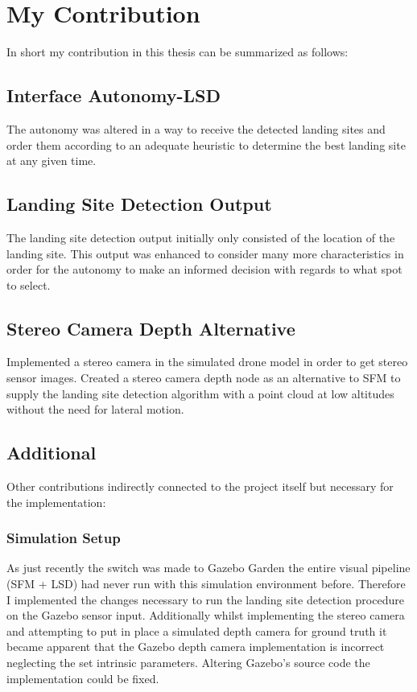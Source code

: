 \chapter{My Contribution}

In short my contribution in this thesis can be summarized as follows:

\section{Interface Autonomy-LSD}
The autonomy was altered in a way to receive the detected landing sites and order them according to an adequate heuristic to determine the best landing site at any given time.
\section{Landing Site Detection Output}
The landing site detection output initially only consisted of the location of the landing site. This output was enhanced to consider many more characteristics in order for the autonomy to make an informed decision with regards to what spot to select.
\section{Stereo Camera Depth Alternative}
Implemented a stereo camera in the simulated drone model in order to get stereo sensor images. Created a stereo camera depth node as an alternative to SFM to supply the landing site detection algorithm with a point cloud at low altitudes without the need for lateral motion. 
\section{Additional}
Other contributions indirectly connected to the project itself but necessary for the implementation:
\subsection{Simulation Setup}
As just recently the switch was made to Gazebo Garden the entire visual pipeline (SFM + LSD) had never run with this simulation environment before. Therefore I implemented the changes necessary to run the landing site detection procedure on the Gazebo sensor input. Additionally whilst implementing the stereo camera and attempting to put in place a simulated depth camera for ground truth it became apparent that the Gazebo depth camera implementation is incorrect neglecting the set intrinsic parameters. Altering Gazebo's source code the implementation could be fixed.
